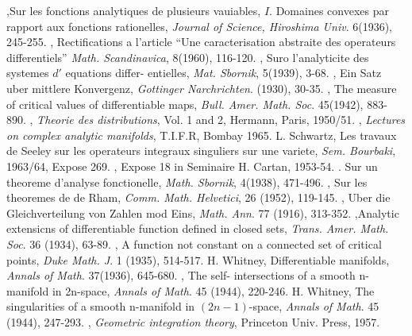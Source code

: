 \begin{thebibliography}{99}
,\pageoriginale Sur les fonctions analytiques de plusieurs
  vauiables, $I$. Domaines convexes par rapport aux fonctions
  rationelles, \textit{Journal of Science, Hiroshima Univ}. 6(1936),
  245-255. 
, Rectifications a l'article ``Une
  caracterisation abstraite des operateurs  differentiels''
  \textit{Math. Scandinavica}, 8(1960), 116-120. 
, Suro l'analyticite des systemes $d'$
  equations differ- entielles, \textit{Mat. Sbornik}, 5(1939), 3-68. 
, Ein Satz uber mittlere Konvergenz,
  \textit{Gottinger Narchrichten}. (1930), 30-35. 
, The measure of critical values of
  differentiable maps, \textit{Bull. Amer. Math. Soc}. 45(1942),
  883-890. 
,  \textit{Theorie des distributions},
  Vol. 1 and 2, Hermann, Paris, 1950/51. 
, \textit{Lectures on complex analytic
  manifolds}, T.I.F.R, Bombay 1965. 
 {L. Schwartz}, Les travaux de Seeley sur les
  operateurs integraux singuliers sur une variete,
  \textit{Sem. Bourbaki}, 1963/64, Expose 269. 
, Expose 18 in Seminaire H. Cartan, 1953-54. 
. Sur un theoreme d'analyse fonctionelle,
  \textit{Math. Sbornik}, 4(1938), 471-496. 
, Sur les theoremes de de Rham,
  \textit{Comm. Math. Helvetici}, 26 (1952), 119-145. 
, Uber die Gleichverteilung von Zahlen mod Eins,
  \textit{Math. Ann}. 77 (1916), 313-352. 
,\pageoriginale Analytic extensicns of differentiable
  function defined in closed sets, \textit{Trans. Amer. Math. Soc}. 36
  (1934), 63-89. 
, A function not constant on a connected set
  of critical points, \textit{Duke Math. J}. 1 (1935), 514-517. 
 {H. Whitney}, Differentiable manifolds, \textit{Annals
  of Math}. 37(1936), 645-680. 
, The self- intersections of a smooth
  n-manifold in 2n-space, \textit{Annals of Math}. 45 (1944),
  220-246. 
 {H. Whitney}, The singularities of a smooth n-manifold
  in $(2n-1)$-space, \textit{Annals of Math}. 45 (1944), 247-293. 
, \textit{Geometric integration theory},
  Princeton Univ. Press, 1957. 
\end{thebibliography}
